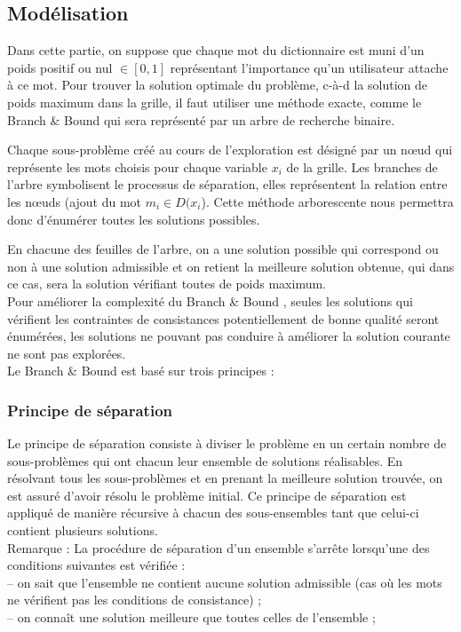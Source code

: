 \documentclass[11pt, letterpaper]{article}
\begin{document}
\subsection{Mod\'{e}lisation}

Dans cette partie, on suppose que chaque mot du dictionnaire est muni d'un poids positif ou nul $\in \left[0,1\right]$ repr\'{e}sentant l'importance qu'un utilisateur attache \`{a} ce mot. Pour trouver la solution optimale du probl\`{e}me, c-\`{a}-d la solution de poids maximum dans la grille, il faut utiliser une m\'{e}thode exacte, comme le \og Branch \& Bound \fg{} qui sera repr\'{e}sent\'{e} par un arbre de recherche binaire.

Chaque sous-probl\`{e}me cr\'{e}\'{e} au cours de l'exploration est d\'{e}sign\'{e} par un n\oe{}ud qui repr\'{e}sente les mots choisis pour chaque variable $x_{i}$ de la grille. Les branches de l'arbre symbolisent le processus de s\'{e}paration, elles repr\'{e}sentent la relation entre les n\oe{}uds (ajout du mot $m_{i} \in D(x_{i}$). Cette m\'{e}thode arborescente nous permettra donc d'\'{e}num\'{e}rer toutes les solutions possibles.

En chacune des feuilles de l'arbre, on a une solution possible qui correspond ou non \`{a} une solution admissible et on retient la meilleure solution obtenue, qui dans ce cas, sera la solution v\'{e}rifiant toutes de poids maximum.\\

Pour am\'{e}liorer la complexit\'{e} du \og Branch \& Bound \fg, seules les solutions qui v\'{e}rifient les contraintes de consistances potentiellement de bonne qualit\'{e} seront \'{e}num\'{e}r\'{e}es, les solutions ne pouvant pas conduire \`{a} am\'{e}liorer la solution courante ne sont pas explor\'{e}es. \\

Le \og Branch \& Bound \fg{} est bas\'{e} sur trois principes :

\subsubsection*{Principe de s\'{e}paration}

Le principe de s\'{e}paration consiste \`{a} diviser le probl\`{e}me en un certain nombre de sous-probl\`{e}mes qui ont chacun leur ensemble de solutions r\'{e}alisables. En r\'{e}solvant tous les sous-probl\`{e}mes et en prenant la meilleure solution trouv\'{e}e, on est assur\'{e} d'avoir r\'{e}solu le probl\`{e}me initial. Ce principe de s\'{e}paration est appliqu\'{e} de mani\`{e}re r\'{e}cursive \`{a} chacun des sous-ensembles tant que celui-ci contient plusieurs solutions. \\
Remarque : La proc\'{e}dure de s\'{e}paration d'un ensemble s'arr\^{e}te lorsqu'une des conditions
suivantes est v\'{e}rifi\'{e}e : \\
-- on sait que l'ensemble ne contient aucune solution admissible (cas o\`{u} les mots ne v\'{e}rifient pas les conditions de consistance) ; \\
-- on conna\^{i}t une solution meilleure que toutes celles de l'ensemble ;
\end{document}
